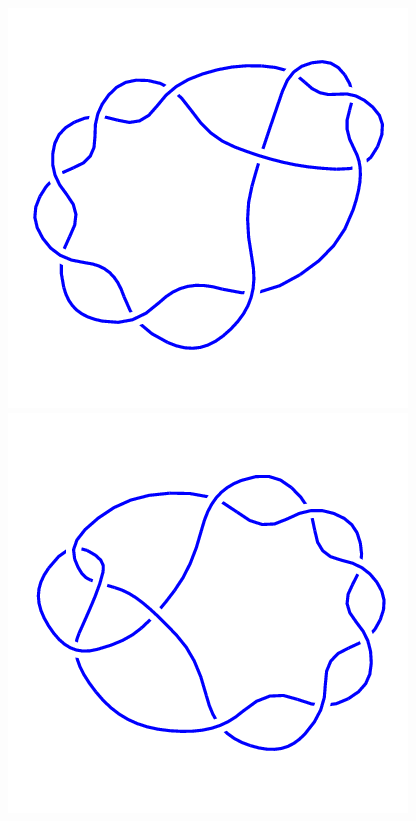 \begin{figure}[H]
\begin{minipage}[b]{.18\linewidth}
	\end{minipage}
	\begin{minipage}[b]{.18\linewidth}
		\centering
		\includegraphics[width=\linewidth]{../data/10_4.png}
	\end{minipage}
	\begin{minipage}[b]{.18\linewidth}
		\centering
		\includegraphics[width=\linewidth]{../data/10_5.png}

\end{minipage}
\end{figure}
